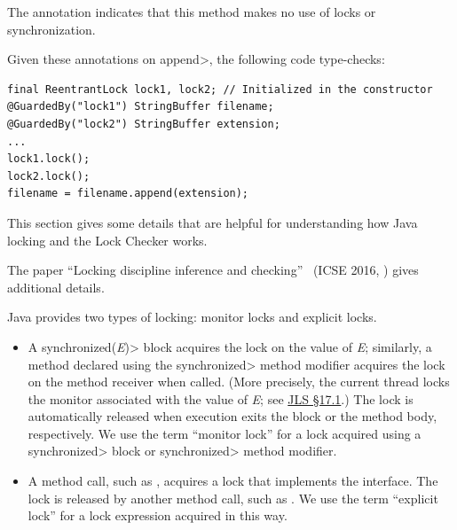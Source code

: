 The  annotation indicates that
this method makes no use of
locks or synchronization.

Given these annotations on \<append>, the following code type-checks:

\begin{verbatim}
final ReentrantLock lock1, lock2; // Initialized in the constructor
@GuardedBy("lock1") StringBuffer filename;
@GuardedBy("lock2") StringBuffer extension;
...
lock1.lock();
lock2.lock();
filename = filename.append(extension);
\end{verbatim}





This section gives some details that are helpful for understanding how Java
locking and the Lock Checker works.

The paper ``Locking discipline inference and checking''~\cite{ErnstLMST2016} (ICSE 2016,
)
gives additional details.



Java provides two types of locking:  monitor locks and explicit locks.

\begin{itemize}
\item
  A \<synchronized(\emph{E})> block acquires the lock on the value of
  \emph{E}; similarly, a method declared using the \<synchronized> method
  modifier acquires the lock on the method receiver when called.
  (More precisely,
  the current thread locks the monitor associated with the value of
  \emph{E}; see \href{https://docs.oracle.com/javase/specs/jls/se17/html/jls-17.html#jls-17.1}{JLS \S17.1}.)
  The lock is automatically released when execution exits the block or the
  method body, respectively.
  We use the term ``monitor lock'' for a lock acquired using a
  \<synchronized>  block or \<synchronized> method modifier.
\item A method call, such as
  ,
  acquires a lock that implements the
  interface.
  The lock is released by another method call, such as
  .
  We use the term ``explicit lock'' for a lock expression acquired in this
  way.
\end{itemize}

